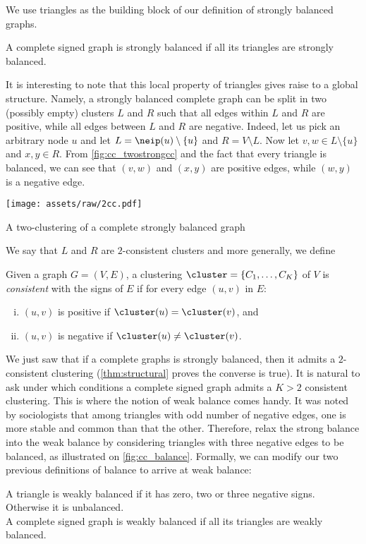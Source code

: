 We use triangles as the building block of our definition of strongly balanced graphs.
\begin{definition}
	A complete signed graph is strongly balanced if all its triangles are strongly balanced.
\end{definition}

It is interesting to note that this local property of triangles gives raise to a global structure.
Namely, a strongly balanced complete graph can be split in two (possibly empty) clusters $L$ and $R$
such that all edges within $L$ and $R$ are positive, while all edges between $L$ and $R$ are
negative. Indeed, let us pick an arbitrary node $u$ and let $L=\neip(u)\setminus \{u\}$ and $R=V\setminus L$. Now
let $v,w\in L\setminus \{u\}$ and $x,y\in R$. From \autoref{fig:cc_twostrongcc} and the fact that
every triangle is balanced, we can see that $(v,w)$ and $(x,y)$ are positive edges, while $(w,y)$ is
a negative edge.
\begin{marginfigure}
  \centering
  \texttt{[image: assets/raw/2cc.pdf]}
  \caption{A two-clustering of a complete strongly balanced graph}
  \label{fig:cc_twostrongcc}
\end{marginfigure}
We say that $L$ and $R$ are $2$-consistent clusters and more generally, we define
\begin{definition}
  Given a graph $G=(V, E)$, a clustering $\cluster=\{C_1, \ldots, C_K\}$ of $V$ is \emph{consistent}
  with the signs of $E$ if for every edge $(u,v)$ in $E$:
  \begin{enumerate}[(i),nosep]
    \item $(u,v)$ is positive if $\cluster(u)=\cluster(v)$, and
    \item $(u,v)$ is negative if $\cluster(u)\neq\cluster(v)$.
  \end{enumerate}
\end{definition}

We just saw that if a complete graphs is strongly balanced, then it admits a $2$-consistent
clustering (\autoref{thm:structural} proves the converse is true). It is natural to ask under which
conditions a complete signed graph admits a $K>2$ consistent clustering. This is where the notion of
weak balance comes handy. It was noted by
sociologists that among triangles with odd number of negative edges, one is more stable and common
than that the other. Therefore, \textcite{davis1967clustering} relax the strong balance into the
weak balance by considering triangles with three negative edges to be balanced, as illustrated on
\autoref{fig:cc_balance}. Formally, we can modify our two previous definitions of balance to arrive
at weak balance:
\begin{definition}
	A triangle is weakly balanced if it has zero, two or three negative signs. Otherwise it is
	unbalanced. \\
	A complete signed graph is weakly balanced if all its triangles are weakly balanced.
\end{definition}

